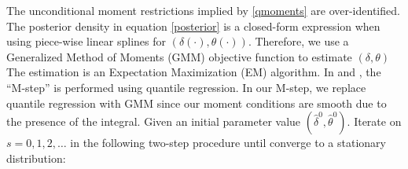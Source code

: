 \documentclass{article}
\begin{document}
The unconditional moment restrictions implied by \eqref{qmoments} are over-identified. The posterior density in equation \eqref{posterior} is a closed-form expression when using piece-wise linear splines for $(\delta(\cdot), \theta(\cdot))$. Therefore, we use a Generalized Method of Moments (GMM) objective function to estimate $(\delta, \theta)$ The estimation is an Expectation Maximization (EM) algorithm. In \cite{Arellano2016} and \cite{Arellano2017}, the ``M-step'' is performed using quantile regression. In our M-step, we replace quantile regression with GMM since our moment conditions are smooth due to the presence of the integral. Given an initial parameter value $(\hat{\delta}^{0}, \hat{\theta}^{0})$. Iterate on $s=0,1,2,\dots$ in the following two-step procedure until converge to a stationary distribution:
\end{document}
